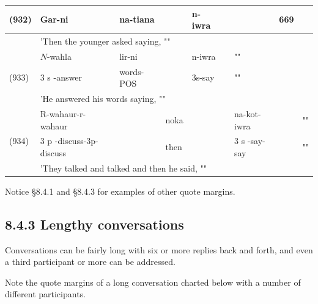 \documentclass[10pt]{article}
\begin{document}
\begin{center}
\begin{tabular}{|l|l|l|l|l|l|l|l|l|}
\hline
\multirow[t]{2}{*}{(932)} & Gar-ni & na-tiana &  & n-iwra &  &  & 669 &  \\
\hline
 & \multicolumn{7}{|l|}{'Then the younger asked saying, ""} &  \\
\hline
\multirow[t]{3}{*}{(933)} & \(N\)-wahla & lir-ni &  & n-iwra &  & "" &  &  \\
\hline
 & 3 s -answer & words-POS &  & 3s-say &  & "" &  &  \\
\hline
 & \multicolumn{7}{|l|}{'He answered his words saying, ""} &  \\
\hline
\multirow[t]{3}{*}{(934)} & R-wahaur-r-wahaur &  & noka &  &  & na-kot-iwra &  & "" \\
\hline
 & 3 p -discuss-3p-discuss &  & then &  &  & 3 s -say-say &  & "" \\
\hline
 & \multicolumn{8}{|l|}{'They talked and talked and then he said, ""} \\
\hline
\end{tabular}
\end{center}

Notice §8.4.1 and §8.4.3 for examples of other quote margins.

\subsection*{8.4.3 Lengthy conversations}
Conversations can be fairly long with six or more replies back and forth, and even a third participant or more can be addressed.

Note the quote margins of a long conversation charted below with a number of different participants.
\end{document}
